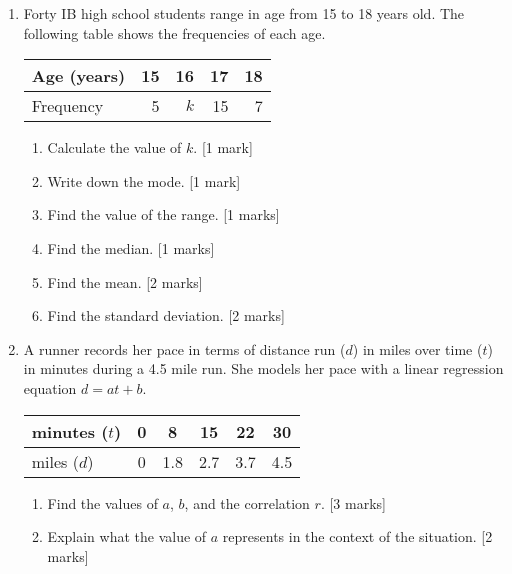 \documentclass[12pt, twoside]{article}
\begin{document}
\begin{enumerate}
\newpage
    \item Forty IB high school students range in age from 15 to 18 years old. The following table shows the frequencies of each age.
        \begin{center}
            \begin{tabular}{|l|r|r|r|r|}
                \hline
                Age (years) & 15 & 16 & 17 & 18\\ 
                \hline 
                Frequency & 5 & $k$ & 15 & 7\\ 
                \hline 
                \end{tabular}      
        \end{center}
        \begin{enumerate}[itemsep=0.8cm]
            \item Calculate the value of $k$. \hfill [1 mark]
            \item Write down the mode. \hfill [1 mark]
            \item Find the value of the range. \hfill [1 marks]
            \item Find the median. \hfill [1 marks]
            \item Find the mean. \hfill [2 marks]
            \item Find the standard deviation. \hfill [2 marks]
        \end{enumerate} \vspace{0.5cm}

    \item A runner records her pace in terms of distance run ($d$) in miles over time ($t$) in minutes during a 4.5 mile run. She models her pace with a linear regression equation $d=at+b$.
        \begin{center}
        \begin{tabular}{|l|c|c|c|c|c|}
            \hline
            minutes ($t$) & 0 & 8 & 15 & 22 & 30 \\ 
            \hline 
            miles ($d$) & 0 & 1.8 & 2.7 & 3.7 & 4.5 \\ 
            \hline 
            \end{tabular}
        \end{center}
        \begin{enumerate}[itemsep=3.5cm]
            \item Find the values of $a$, $b$, and the correlation $r$. \hfill [3 marks]
            \item Explain what the value of $a$ represents in the context of the situation. \hfill [2 marks]
        \end{enumerate}


\end{enumerate}
\end{document}
